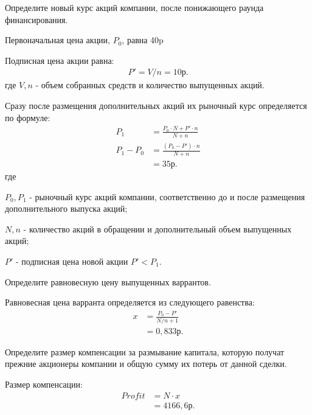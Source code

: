 \documentclass[12pt, table, a4paper,twoside]{exam}
\begin{document}
\begin{questions}
\noaddpoints

\begin{subparts}
	\subpart[5] Определите новый курс акций компании, после понижающего раунда финансирования.
	
	\begin{solution}[12em]
	Первоначальная цена акции, $P_0$, равна 40p
	
	Подписная цена акции равна:
	\begin{align}
	P'=V/n=10\text{р.}
	\end{align}
	где $V, n$ - объем собранных средств и количество выпущенных акций.
	
	Сразу после размещения дополнительных акций их рыночный курс определяется по формуле:
	\begin{align}
	P_1&=\frac{P_0 \cdot N + P' \cdot n}{N + n}\\
	P_1-P_0 &=\frac{(P_0 - P') \cdot n }{N+n}\\
	&=35\text{р.}
	\end{align}
	где
	
	$P_0, P_1$ - рыночный курс акций компании, соответственно до и после размещения дополнительного выпуска акций;
	
	$N, n$ - количество акций в обращении и дополнительный объем выпущенных акций;
	
	$P'$ - подписная цена новой акции $P'< P_1$.
	\end{solution}
	
	\subpart[10] Определите равновесную цену выпущенных варрантов.
	
	\begin{solution}[12em]
	Равновесная цена варранта определяется из следующего равенства:
	\begin{align}
	x &=\frac{P_0 - P'}{N/n + 1}\\
	&=0,833р.
	\end{align}
	
	\end{solution}

	\subpart[5] Определите размер компенсации за размывание капитала, которую получат прежние акционеры компании и общую сумму их потерь от данной сделки.

	\begin{solution}[12em]

		\raggedright
		Размер компенсации:
		\begin{align}
		Profit &=N \cdot x\\
		&=4166,6\text{р.}
		\end{align}
		

\end{solution}
\end{subparts}
\end{questions}
\end{document}
